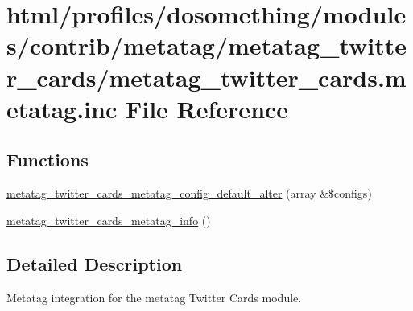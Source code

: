 \hypertarget{metatag__twitter__cards_8metatag_8inc}{
\section{html/profiles/dosomething/modules/contrib/metatag/metatag\_\-twitter\_\-cards/metatag\_\-twitter\_\-cards.metatag.inc File Reference}
\label{metatag__twitter__cards_8metatag_8inc}
}
\subsection*{Functions}
\begin{DoxyCompactItemize}
\item 
\hyperlink{metatag__twitter__cards_8metatag_8inc_abd7fefaf3c0fe36415e2265262938e71}{metatag\_\-twitter\_\-cards\_\-metatag\_\-config\_\-default\_\-alter} (array \&\$configs)
\item 
\hyperlink{metatag__twitter__cards_8metatag_8inc_ac1c91b0b83d240ae2dc43d69ba1fd059}{metatag\_\-twitter\_\-cards\_\-metatag\_\-info} ()
\end{DoxyCompactItemize}


\subsection{Detailed Description}
Metatag integration for the metatag Twitter Cards module. 

